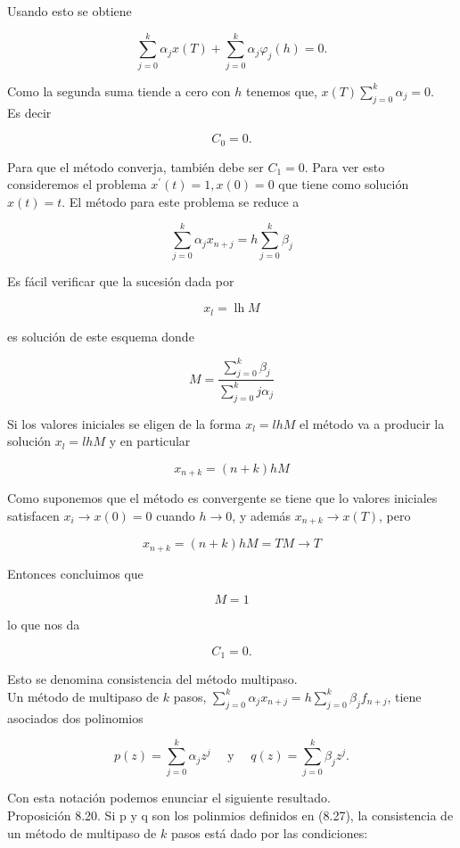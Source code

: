\documentclass[10pt]{article}
\begin{document}
Usando esto se obtiene

$$
\sum_{j=0}^{k} \alpha_{j} x(T)+\sum_{j=0}^{k} \alpha_{j} \varphi_{j}(h)=0 .
$$

Como la segunda suma tiende a cero con $h$ tenemos que, $x(T) \sum_{j=0}^{k} \alpha_{j}=0$.\\
Es decir

$$
C_{0}=0 .
$$

Para que el método converja, también debe ser $C_{1}=0$. Para ver esto consideremos el problema $x^{\prime}(t)=1, x(0)=0$ que tiene como solución $x(t)=t$. El método para este problema se reduce a

$$
\sum_{j=0}^{k} \alpha_{j} x_{n+j}=h \sum_{j=0}^{k} \beta_{j}
$$

Es fácil verificar que la sucesión dada por

$$
x_{l}=\operatorname{lh} M
$$

es solución de este esquema donde

$$
M=\frac{\sum_{j=0}^{k} \beta_{j}}{\sum_{j=0}^{k} j \alpha_{j}}
$$

Si los valores iniciales se eligen de la forma $x_{l}=l h M$ el método va a producir la solución $x_{l}=l h M$ y en particular

$$
x_{n+k}=(n+k) h M
$$

Como suponemos que el método es convergente se tiene que lo valores iniciales satisfacen $x_{i} \rightarrow x(0)=0$ cuando $h \rightarrow 0$, y además $x_{n+k} \rightarrow x(T)$, pero

$$
x_{n+k}=(n+k) h M=T M \rightarrow T
$$

Entonces concluimos que

$$
M=1
$$

lo que nos da

$$
C_{1}=0 .
$$

Esto se denomina consistencia del método multipaso.\\
Un método de multipaso de $k$ pasos, $\sum_{j=0}^{k} \alpha_{j} x_{n+j}=h \sum_{j=0}^{k} \beta_{j} f_{n+j}$, tiene asociados dos polinomios


\begin{equation*}
p(z)=\sum_{j=0}^{k} \alpha_{j} z^{j} \quad \text { y } \quad q(z)=\sum_{j=0}^{k} \beta_{j} z^{j} . \tag{8.27}
\end{equation*}


Con esta notación podemos enunciar el siguiente resultado.\\
Proposición 8.20. Si p y q son los polinmios definidos en (8.27), la consistencia de un método de multipaso de $k$ pasos está dado por las condiciones:
\end{document}
